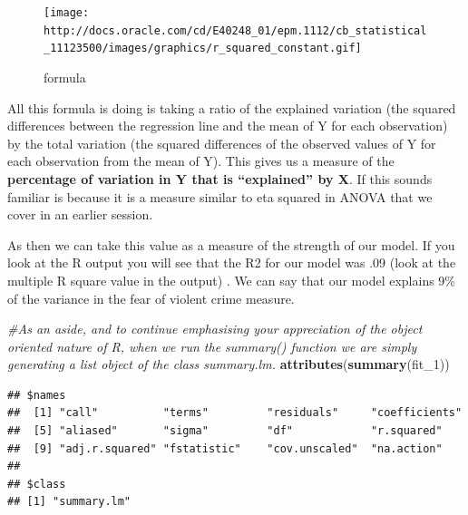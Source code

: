 \documentclass[]{book}
\newenvironment{Shaded}{\begin{snugshade}}{\end{snugshade}}
\newcommand{\CommentTok}[1]{\textcolor[rgb]{0.56,0.35,0.01}{\textit{#1}}}
\newcommand{\DecValTok}[1]{\textcolor[rgb]{0.00,0.00,0.81}{#1}}
\newcommand{\KeywordTok}[1]{\textcolor[rgb]{0.13,0.29,0.53}{\textbf{#1}}}
\newcommand{\NormalTok}[1]{#1}
\newcommand{\OperatorTok}[1]{\textcolor[rgb]{0.81,0.36,0.00}{\textbf{#1}}}
\theoremstyle{definition}
\theoremstyle{definition}
\theoremstyle{definition}
\theoremstyle{remark}
\begin{document}
\begin{figure}
\centering
\texttt{[image: http://docs.oracle.com/cd/E40248\_01/epm.1112/cb\_statistical\_11123500/images/graphics/r\_squared\_constant.gif]}
\caption{formula}
\end{figure}

All this formula is doing is taking a ratio of the explained variation
(the squared differences between the regression line and the mean of Y
for each observation) by the total variation (the squared differences of
the observed values of Y for each observation from the mean of Y). This
gives us a measure of the \textbf{percentage of variation in Y that is
``explained'' by X}. If this sounds familiar is because it is a measure
similar to eta squared in ANOVA that we cover in an earlier session.

As then we can take this value as a measure of the strength of our
model. If you look at the R output you will see that the R2 for our
model was .09 (look at the multiple R square value in the output) . We
can say that our model explains 9\% of the variance in the fear of
violent crime measure.

\begin{Shaded}
\begin{Highlighting}[]
\CommentTok{#As an aside, and to continue emphasising your appreciation of the object oriented nature of R, when we run the summary() function we are simply generating a list object of the class summary.lm.}
\KeywordTok{attributes}\NormalTok{(}\KeywordTok{summary}\NormalTok{(fit_}\DecValTok{1}\NormalTok{))}
\end{Highlighting}
\end{Shaded}

\begin{verbatim}
## $names
##  [1] "call"          "terms"         "residuals"     "coefficients" 
##  [5] "aliased"       "sigma"         "df"            "r.squared"    
##  [9] "adj.r.squared" "fstatistic"    "cov.unscaled"  "na.action"    
## 
## $class
## [1] "summary.lm"
\end{verbatim}

\begin{Shaded}
\end{Shaded}
\end{document}
